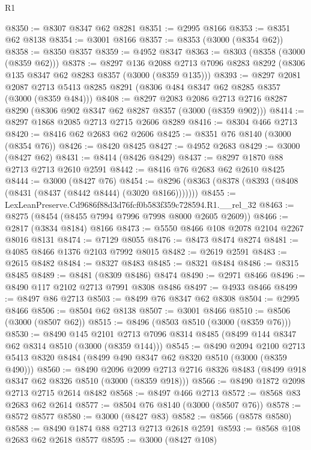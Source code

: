 \begin{lexlean}{R1}
\begin{coremodule}
@8350 := @8307 @8347 @62 @8281
@8351 := @2995 @8166
@8353 := @8351 @62 @8138
@8354 := @3001 @8166
@8357 := @8353 (@3000 (@8354 @62))
@8358 := @8350 @8357
@8359 := @4952 @8347
@8363 := @8303 (@8358 (@3000 (@8359 @62)))
@8378 := @8297
    @136
    @2088
    @2713
    @7096
    @8283
    @8292
    (@8306 @135 @8347 @62 @8283 @8357 (@3000 (@8359 @135)))
@8393 := @8297
    @2081
    @2087
    @2713
    @5413
    @8285
    @8291
    (@8306 @484 @8347 @62 @8285 @8357 (@3000 (@8359 @484)))
@8408 := @8297
    @2083
    @2086
    @2713
    @2716
    @8287
    @8290
    (@8306 @902 @8347 @62 @8287 @8357 (@3000 (@8359 @902)))
@8414 := @8297 @1868 @2085 @2713 @2715 @2606 @8289
@8416 := @8304 @466 @2713
@8420 := @8416 @62 @2683 @62 @2606
@8425 := @8351 @76 @8140 (@3000 (@8354 @76))
@8426 := @8420 @8425
@8427 := @4952 @2683
@8429 := @3000 (@8427 @62)
@8431 := @8414 (@8426 @8429)
@8437 := @8297 @1870 @88 @2713 @2713 @2610 @2591
@8442 := @8416 @76 @2683 @62 @2610 @8425
@8444 := @3000 (@8427 @76)
@8454 := @8296 (@8363 (@8378 (@8393 (@8408 (@8431 (@8437 (@8442 @8444) (@3020 @8166)))))))
@8455 := LexLeanPreserve.Cd9686f88d3d76fcf0b583f359c728594.R1.__rel_32
@8463 := @8275 (@8454 (@8455 @7994 @7996 @7998 @8000 @2605 @2609))
@8466 := @2817 (@3834 @8184) @8166
@8473 := @5550 @8466 @108 @2078 @2104 @2267 @8016 @8131
@8474 := @7129 @8055
@8476 := @8473 @8474 @8274
@8481 := @4085 @8466 @1376 @2103 @7992 @8015
@8482 := @2619 @2591
@8483 := @2615 @8482
@8484 := @8327 @8483
@8485 := @8321 @8484
@8486 := @8315 @8485
@8489 := @8481 (@8309 @8486) @8474
@8490 := @2971 @8466
@8496 := @8490 @117 @2102 @2713 @7991 @8308 @8486
@8497 := @4933 @8466
@8499 := @8497 @86 @2713
@8503 := @8499 @76 @8347 @62 @8308
@8504 := @2995 @8466
@8506 := @8504 @62 @8138
@8507 := @3001 @8466
@8510 := @8506 (@3000 (@8507 @62))
@8515 := @8496 (@8503 @8510 (@3000 (@8359 @76)))
@8530 := @8490
    @145
    @2101
    @2713
    @7096
    @8314
    @8485
    (@8499 @144 @8347 @62 @8314 @8510 (@3000 (@8359 @144)))
@8545 := @8490
    @2094
    @2100
    @2713
    @5413
    @8320
    @8484
    (@8499 @490 @8347 @62 @8320 @8510 (@3000 (@8359 @490)))
@8560 := @8490
    @2096
    @2099
    @2713
    @2716
    @8326
    @8483
    (@8499 @918 @8347 @62 @8326 @8510 (@3000 (@8359 @918)))
@8566 := @8490 @1872 @2098 @2713 @2715 @2614 @8482
@8568 := @8497 @466 @2713
@8572 := @8568 @83 @2683 @62 @2614
@8577 := @8504 @76 @8140 (@3000 (@8507 @76))
@8578 := @8572 @8577
@8580 := @3000 (@8427 @83)
@8582 := @8566 (@8578 @8580)
@8588 := @8490 @1874 @88 @2713 @2713 @2618 @2591
@8593 := @8568 @108 @2683 @62 @2618 @8577
@8595 := @3000 (@8427 @108)

\end{coremodule}
\end{lexlean}
